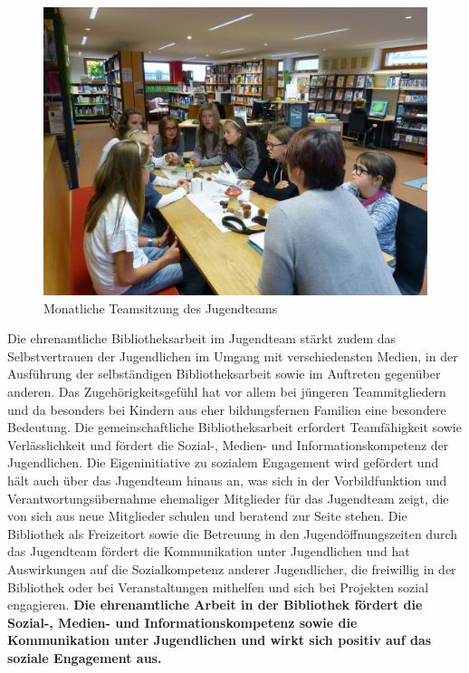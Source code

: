 \documentclass[a4paper,
fontsize=11pt,
oneside,
numbers=noperiodatend,
parskip=half-,
bibliography=totoc,
final
]{scrartcl}
\begin{document}
\begin{figure}
\centering
\includegraphics{image_2.jpg}
\caption{Monatliche Teamsitzung des Jugendteams}
\end{figure}

Die ehrenamtliche Bibliotheksarbeit im Jugendteam stärkt zudem das
Selbstvertrauen der Jugendlichen im Umgang mit verschiedensten Medien,
in der Ausführung der selbständigen Bibliotheksarbeit sowie im Auftreten
gegenüber anderen. Das Zugehörigkeitsgefühl hat vor allem bei jüngeren
Teammitgliedern und da besonders bei Kindern aus eher bildungsfernen
Familien eine besondere Bedeutung. Die gemeinschaftliche
Bibliotheksarbeit erfordert Teamfähigkeit sowie Verlässlichkeit und
fördert die Sozial-, Medien- und Informationskompetenz der Jugendlichen.
Die Eigeninitiative zu sozialem Engagement wird gefördert und hält auch
über das Jugendteam hinaus an, was sich in der Vorbildfunktion und
Verantwortungsübernahme ehemaliger Mitglieder für das Jugendteam zeigt,
die von sich aus neue Mitglieder schulen und beratend zur Seite stehen.
Die Bibliothek als Freizeitort sowie die Betreuung in den
Jugendöffnungszeiten durch das Jugendteam fördert die Kommunikation
unter Jugendlichen und hat Auswirkungen auf die Sozialkompetenz anderer
Jugendlicher, die freiwillig in der Bibliothek oder bei Veranstaltungen
mithelfen und sich bei Projekten sozial engagieren. \textbf{Die
ehrenamtliche Arbeit in der Bibliothek fördert die Sozial-, Medien- und
Informationskompetenz sowie die Kommunikation unter Jugendlichen und
wirkt sich positiv auf das soziale Engagement aus.}
\end{document}
